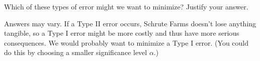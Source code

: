 \documentclass[noanswers]{exam}
\begin{document}
\begin{questions}
\begin{solution}[\stretch{1}]
\end{solution}

\question Which of these types of error might we want to minimize? Justify your answer. 

\begin{solution}[\stretch{1}]

\vspace{1mm}

Answers may vary. If a Type II error occurs, Schrute Farms doesn't lose anything tangible, so a Type I error might be more costly and thus have more serious consequences. We would probably want to minimize a Type I error. (You could do this by choosing a smaller significance level $\alpha$.)

\vspace{1mm}

\end{solution}

\end{questions}
\end{document}

